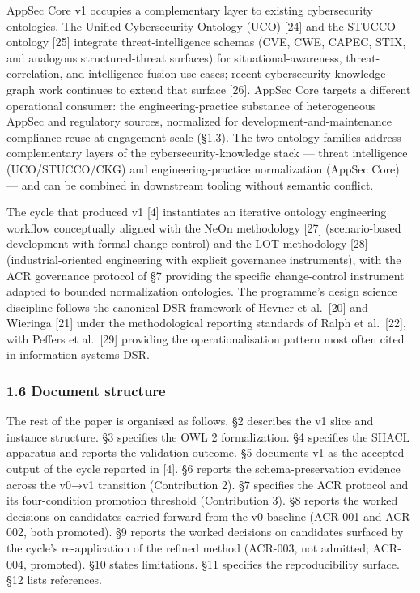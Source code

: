 \documentclass[
]{article}
\begin{document}
AppSec Core v1 occupies a complementary layer to existing cybersecurity
ontologies. The Unified Cybersecurity Ontology (UCO) {[}24{]} and the
STUCCO ontology {[}25{]} integrate threat-intelligence schemas (CVE,
CWE, CAPEC, STIX, and analogous structured-threat surfaces) for
situational-awareness, threat-correlation, and intelligence-fusion use
cases; recent cybersecurity knowledge-graph work continues to extend
that surface {[}26{]}. AppSec Core targets a different operational
consumer: the engineering-practice substance of heterogeneous AppSec and
regulatory sources, normalized for development-and-maintenance
compliance reuse at engagement scale (§1.3). The two ontology families
address complementary layers of the cybersecurity-knowledge stack ---
threat intelligence (UCO/STUCCO/CKG) and engineering-practice
normalization (AppSec Core) --- and can be combined in downstream
tooling without semantic conflict.

The cycle that produced v1 {[}4{]} instantiates an iterative ontology
engineering workflow conceptually aligned with the NeOn methodology
{[}27{]} (scenario-based development with formal change control) and the
LOT methodology {[}28{]} (industrial-oriented engineering with explicit
governance instruments), with the ACR governance protocol of §7
providing the specific change-control instrument adapted to bounded
normalization ontologies. The programme's design science discipline
follows the canonical DSR framework of Hevner et al.~{[}20{]} and
Wieringa {[}21{]} under the methodological reporting standards of Ralph
et al.~{[}22{]}, with Peffers et al.~{[}29{]} providing the
operationalisation pattern most often cited in information-systems DSR.

\subsubsection{1.6 Document structure}\label{document-structure}

The rest of the paper is organised as follows. §2 describes the v1 slice
and instance structure. §3 specifies the OWL 2 formalization. §4
specifies the SHACL apparatus and reports the validation outcome. §5
documents v1 as the accepted output of the cycle reported in {[}4{]}. §6
reports the schema-preservation evidence across the v0→v1 transition
(Contribution 2). §7 specifies the ACR protocol and its four-condition
promotion threshold (Contribution 3). §8 reports the worked decisions on
candidates carried forward from the v0 baseline (ACR-001 and ACR-002,
both promoted). §9 reports the worked decisions on candidates surfaced
by the cycle's re-application of the refined method (ACR-003, not
admitted; ACR-004, promoted). §10 states limitations. §11 specifies the
reproducibility surface. §12 lists references.
\end{document}
